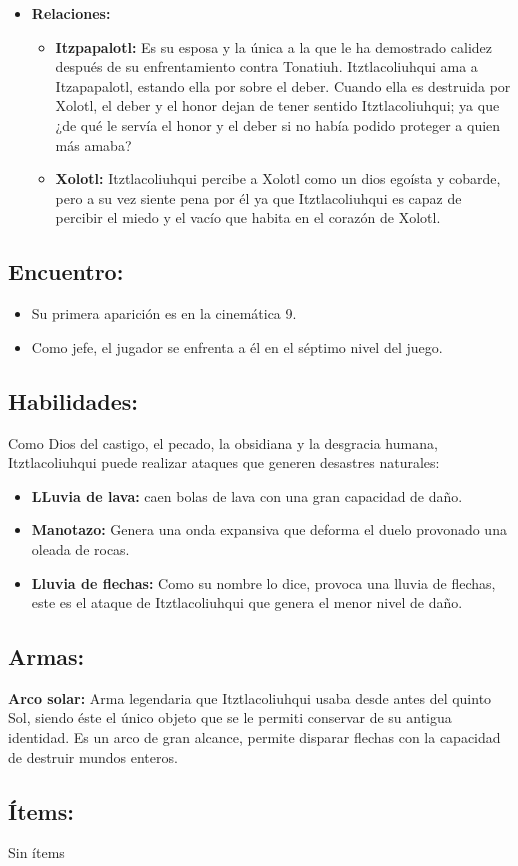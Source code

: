 \begin{itemize}
	\item \textbf{Relaciones:}
	\begin{itemize}
		\item \textbf{Itzpapalotl:} Es su esposa y la única a la que le ha demostrado calidez después de su enfrentamiento contra Tonatiuh. Itztlacoliuhqui ama a Itzapapalotl, estando ella por sobre el deber. Cuando ella es destruida por Xolotl, el deber y el honor dejan de tener sentido Itztlacoliuhqui; ya que ¿de qué le servía el honor y el deber si no había podido proteger a quien más amaba?
		\item \textbf{Xolotl: } Itztlacoliuhqui percibe a Xolotl como un dios egoísta y cobarde, pero a su vez siente pena por él ya que Itztlacoliuhqui es capaz de percibir el miedo y el vacío que habita en el corazón de Xolotl. 
	\end{itemize}			  
\end{itemize}

\subsection{Encuentro:}
\begin{itemize}
	\item Su primera aparición es en la cinemática 9.
	\item Como jefe, el jugador se enfrenta a él en el séptimo nivel del juego.
\end{itemize} 

\subsection{Habilidades:}
Como Dios del castigo, el pecado, la obsidiana y la desgracia humana, Itztlacoliuhqui puede realizar ataques que generen desastres naturales:
\begin{itemize}
	\item \textbf{LLuvia de lava:} caen bolas de lava con una gran capacidad de daño.
	\item \textbf{Manotazo:} Genera una onda expansiva que deforma el duelo provonado una oleada de rocas.
	\item \textbf{Lluvia de flechas:} Como su nombre lo dice, provoca una lluvia de flechas, este es el ataque de Itztlacoliuhqui que genera el menor nivel de daño. 
\end{itemize}
\subsection{Armas:}
\textbf{Arco solar:} Arma legendaria que Itztlacoliuhqui usaba desde antes del quinto Sol, siendo éste el único objeto que se le permiti conservar de su antigua identidad. Es un arco de gran alcance, permite disparar flechas con la capacidad de destruir mundos enteros. 
\subsection{Ítems:}
Sin ítems